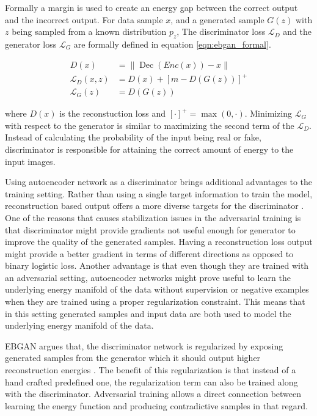 Formally a margin is used to create an energy gap between the correct output and the incorrect
output. For data sample $x$, and a generated sample $G(z)$ with $z$ being sampled from a known
distribution $p_z$, The discriminator loss $\mathcal{L}_{D}$ and the generator loss
$\mathcal{L}_{G}$ are formally defined in equation \ref{eqn:ebgan_formal}.

\begin{equation}
\label{eqn:ebgan_formal}
\begin{aligned}D(x)&=\|\operatorname{Dec}(E n c(x))-x\|\\ \mathcal{L}_{D}(x, z) &=D(x)+[m-D(G(z))]^{+} \\ \mathcal{L}_{G}(z) &=D(G(z)) \end{aligned}
\end{equation}

where $D(x)$ is the reconstuction loss and  $[\cdot]^{+}=\max (0, \cdot)$. Minimizing
$\mathcal{L}_{G}$ with respect to the generator is similar to maximizing the second term of the
$\mathcal{L}_{D}$. Instead of calculating the probability of the input being real or fake,
discriminator is responsible for attaining the correct amount of energy to the input images. 

Using autoencoder network as a discriminator brings additional advantages to the training setting.
Rather than using a single target information to train the model, reconstruction based output offers
a more diverse targets for the discriminator \cite{Zhao2016EnergybasedGA}. One of the reasons that causes
stabilization issues in the adversarial training is that discriminator might provide gradients not
useful enough for generator to improve the quality of the generated samples. Having a reconstruction
loss output might provide a better gradient in terms of different directions as opposed to binary
logistic loss\cite{Zhao2016EnergybasedGA}. Another advantage is that even though they are trained with an adversarial setting,
autoencoder networks might prove useful to learn the underlying energy manifold of the data without
supervision or negative examples when they are trained using a proper regularization constraint.
This means that in this setting generated samples and input data are both used to model the
underlying energy manifold of the data. 

EBGAN argues that, the discriminator network is regularized by exposing generated samples
from the generator  which it should output higher reconstruction energies
\cite{Zhao2016EnergybasedGA}. The benefit of this regularization is that instead of a hand crafted
predefined one, the regularization term can also be trained along with the discriminator.
Adversarial training allows a direct connection between learning the energy function and producing
contradictive samples in that regard. 

